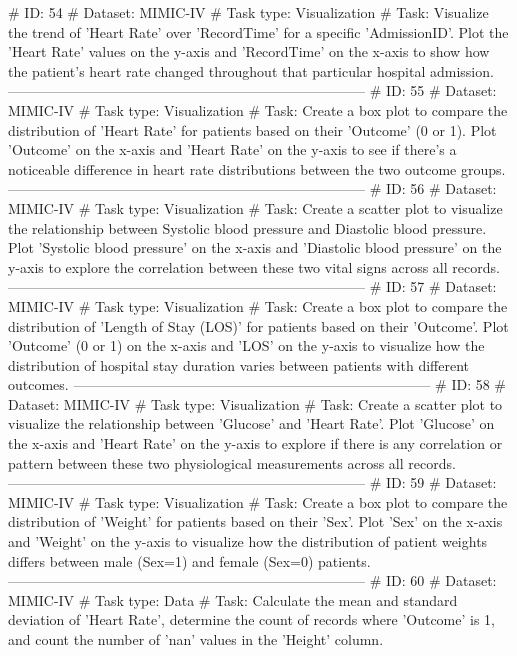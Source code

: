 \begin{tcolorbox}[colback=cadmiumgreen!5!white,colframe=forestgreen!75!white,breakable,title=\textit{Generated analytical tasks in task 4.}]
\begin{VerbatimWrap}
# ID: 54  
# Dataset: MIMIC-IV 
# Task type: Visualization
# Task: Visualize the trend of 'Heart Rate' over 'RecordTime' for a specific 'AdmissionID'. Plot the 'Heart Rate' values on the y-axis and 'RecordTime' on the x-axis to show how the patient's heart rate changed throughout that particular hospital admission.
-----------------------------------------------------------------------------
# ID: 55  
# Dataset: MIMIC-IV 
# Task type: Visualization
# Task: Create a box plot to compare the distribution of 'Heart Rate' for patients based on their 'Outcome' (0 or 1). Plot 'Outcome' on the x-axis and 'Heart Rate' on the y-axis to see if there's a noticeable difference in heart rate distributions between the two outcome groups.
-----------------------------------------------------------------------------
# ID: 56  
# Dataset: MIMIC-IV 
# Task type: Visualization
# Task: Create a scatter plot to visualize the relationship between Systolic blood pressure and Diastolic blood pressure. Plot 'Systolic blood pressure' on the x-axis and 'Diastolic blood pressure' on the y-axis to explore the correlation between these two vital signs across all records.
-----------------------------------------------------------------------------
# ID: 57  
# Dataset: MIMIC-IV 
# Task type: Visualization
# Task: Create a box plot to compare the distribution of 'Length of Stay (LOS)' for patients based on their 'Outcome'. Plot 'Outcome' (0 or 1) on the x-axis and 'LOS' on the y-axis to visualize how the distribution of hospital stay duration varies between patients with different outcomes.
-----------------------------------------------------------------------------
# ID: 58  
# Dataset: MIMIC-IV 
# Task type: Visualization
# Task: Create a scatter plot to visualize the relationship between 'Glucose' and 'Heart Rate'. Plot 'Glucose' on the x-axis and 'Heart Rate' on the y-axis to explore if there is any correlation or pattern between these two physiological measurements across all records.
-----------------------------------------------------------------------------
# ID: 59  
# Dataset: MIMIC-IV 
# Task type: Visualization
# Task: Create a box plot to compare the distribution of 'Weight' for patients based on their 'Sex'. Plot 'Sex' on the x-axis and 'Weight' on the y-axis to visualize how the distribution of patient weights differs between male (Sex=1) and female (Sex=0) patients.
-----------------------------------------------------------------------------
# ID: 60  
# Dataset: MIMIC-IV 
# Task type: Data
# Task: Calculate the mean and standard deviation of 'Heart Rate', determine the count of records where 'Outcome' is 1, and count the number of 'nan' values in the 'Height' column.

\end{VerbatimWrap}
\end{tcolorbox}
